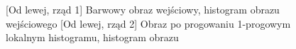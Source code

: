 \documentclass[a4paper,12pt, titlepage]{report}
\begin{document}
\FloatBarrier
\begin{figure}[h]
    \centering
    \qquad
    \caption{[Od lewej, rząd 1] Barwowy obraz wejściowy, histogram obrazu wejściowego [Od lewej, rząd 2] Obraz po progowaniu 1-progowym lokalnym histogramu, histogram obrazu}%
    \label{fig:geo_after_grey1}%
\end{figure}
\FloatBarrier
\end{document}
